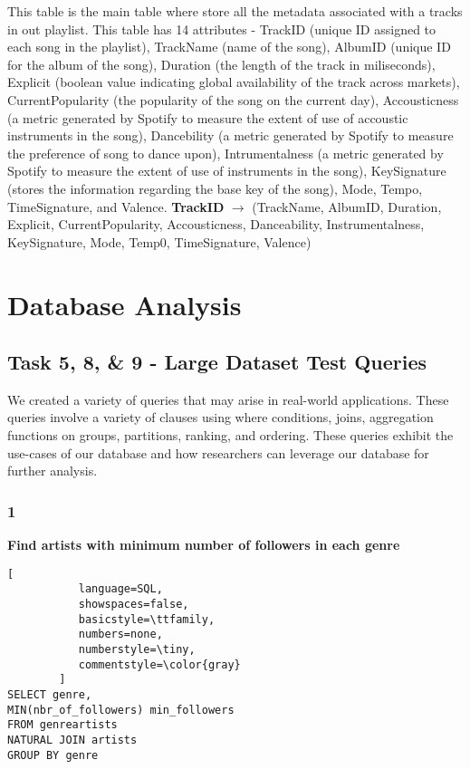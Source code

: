 \documentclass[conference]{IEEEtran}
\begin{document}
This table is the main table where store all the metadata associated with a tracks in out playlist. This table has 14 attributes - TrackID (unique ID assigned to each song in the playlist), TrackName (name of the song), AlbumID (unique ID for the album of the song), Duration (the length of the track in miliseconds), Explicit (boolean value indicating global availability of the track across markets), CurrentPopularity (the popularity of the song on the current day), Accousticness (a metric generated by Spotify to measure the extent of use of accoustic instruments in the song), Dancebility (a metric generated by Spotify to measure the preference of song to dance upon), Intrumentalness (a metric generated by Spotify to measure the extent of use of instruments in the song), KeySignature (stores the information regarding the base key of the song), Mode, Tempo, TimeSignature, and Valence. \linebreak \linebreak
\textbf{TrackID} $\to$ (TrackName, AlbumID, Duration, Explicit, CurrentPopularity, Accousticness, Danceability, Instrumentalness, KeySignature, Mode, Temp0, TimeSignature, Valence)

\section{Database Analysis}

\subsection{\textbf{Task 5, 8, \& 9} - Large Dataset Test Queries}
We created a variety of queries that may arise in real-world applications. These queries involve a variety of clauses using where conditions, joins, aggregation functions on groups, partitions, ranking, and ordering. These queries exhibit the use-cases of our database and how researchers can leverage our database for further analysis. 

\subsubsection*{1} \textbf{Find artists with minimum number of followers in each genre}

\begin{lstlisting}[
           language=SQL,
           showspaces=false,
           basicstyle=\ttfamily,
           numbers=none,
           numberstyle=\tiny,
           commentstyle=\color{gray}
        ]
SELECT genre, 
MIN(nbr_of_followers) min_followers
FROM genreartists 
NATURAL JOIN artists 
GROUP BY genre
\end{lstlisting}
\end{document}
